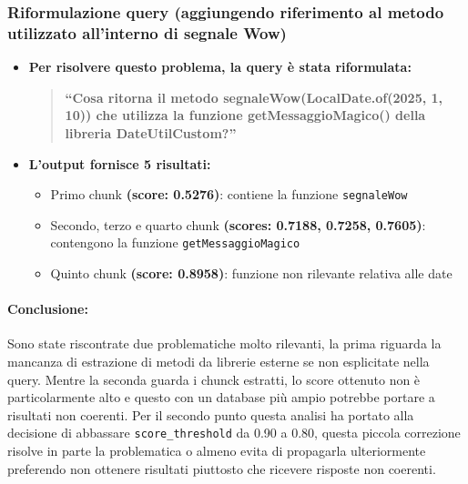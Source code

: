 \documentclass[12pt,a4paper,openright,twoside]{book}
\begin{document}
    \subsubsection{Riformulazione query (aggiungendo riferimento al metodo utilizzato all'interno di segnale Wow)}
        \begin{itemize}
            \item \textbf{Per risolvere questo problema, la query è stata riformulata:}
            \begin{quote}
                \textbf{``Cosa ritorna il metodo segnaleWow(LocalDate.of(2025, 1, 10)) che utilizza la funzione getMessaggioMagico() della libreria DateUtilCustom?''}
            \end{quote}
            \item \textbf{L'output fornisce 5 risultati:}
            \begin{itemize}
                \item Primo chunk \textbf{(score: 0.5276)}: contiene la funzione \texttt{segnaleWow}
                \item Secondo, terzo e quarto chunk \textbf{(scores: 0.7188, 0.7258, 0.7605)}: contengono la funzione \texttt{getMessaggioMagico}
                \item Quinto chunk \textbf{(score: 0.8958)}: funzione non rilevante relativa alle date
            \end{itemize}
        \end{itemize}

    \paragraph{Conclusione:}
    Sono state riscontrate due problematiche molto rilevanti, la prima riguarda la mancanza di estrazione di metodi da librerie esterne se non esplicitate nella query.
    Mentre la seconda guarda i chunck estratti, lo score ottenuto non è particolarmente alto e questo con un database più ampio potrebbe portare a risultati non coerenti.
    Per il secondo punto questa analisi ha portato alla decisione di abbassare \texttt{score\_threshold} da 0.90 a 0.80,
    questa piccola correzione risolve in parte la problematica o almeno evita di propagarla ulteriormente preferendo non ottenere risultati piuttosto che ricevere risposte non coerenti.
    
\end{document}
